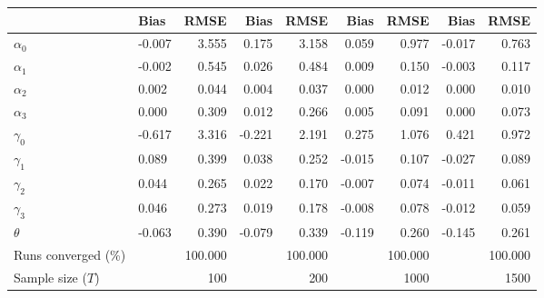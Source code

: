 
\begin{tabular}[t]{llrrrrrrr}
\toprule
  & Bias & RMSE & Bias & RMSE & Bias & RMSE & Bias & RMSE\\
\midrule
$\alpha_{0}$ & -0.007 & 3.555 & 0.175 & 3.158 & 0.059 & 0.977 & -0.017 & 0.763\\
$\alpha_{1}$ & -0.002 & 0.545 & 0.026 & 0.484 & 0.009 & 0.150 & -0.003 & 0.117\\
$\alpha_{2}$ & 0.002 & 0.044 & 0.004 & 0.037 & 0.000 & 0.012 & 0.000 & 0.010\\
$\alpha_{3}$ & 0.000 & 0.309 & 0.012 & 0.266 & 0.005 & 0.091 & 0.000 & 0.073\\
$\gamma_{0}$ & -0.617 & 3.316 & -0.221 & 2.191 & 0.275 & 1.076 & 0.421 & 0.972\\
$\gamma_{1}$ & 0.089 & 0.399 & 0.038 & 0.252 & -0.015 & 0.107 & -0.027 & 0.089\\
$\gamma_{2}$ & 0.044 & 0.265 & 0.022 & 0.170 & -0.007 & 0.074 & -0.011 & 0.061\\
$\gamma_{3}$ & 0.046 & 0.273 & 0.019 & 0.178 & -0.008 & 0.078 & -0.012 & 0.059\\
$\theta$ & -0.063 & 0.390 & -0.079 & 0.339 & -0.119 & 0.260 & -0.145 & 0.261\\
Runs converged (\%) &  & 100.000 &  & 100.000 &  & 100.000 &  & 100.000\\
Sample size ($T$) &  & 100 &  & 200 &  & 1000 &  & 1500\\
\bottomrule
\end{tabular}
